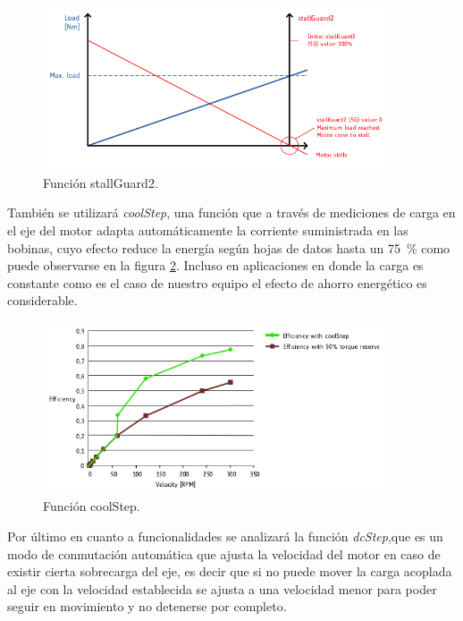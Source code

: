 \begin{figure}[ht]
\centering 
\includegraphics[width=0.9\textwidth]{./Figures/tmc5130_stallguard2.png}
\caption{Función stallGuard2.}
\label{fig:tmc5130_stallGuard2}
\end{figure}

También se utilizará \textit{coolStep}, una función que a través de mediciones de carga en el eje del motor adapta automáticamente la corriente suministrada en las bobinas, cuyo efecto reduce la energía según hojas de datos hasta un \SI{75}{\percent} como puede observarse en la figura \ref{fig:tmc5130_coolStep}. Incluso en aplicaciones en donde la carga es constante como es el caso de nuestro equipo el efecto de ahorro energético es considerable.

\begin{figure}[ht]
\centering 
\includegraphics[width=0.9\textwidth]{./Figures/tmc5130_coolstep.png}
\caption{Función coolStep.}
\label{fig:tmc5130_coolStep}
\end{figure}

Por último en cuanto a funcionalidades se analizará la función \textit{dcStep},que es un modo de conmutación automática que ajusta la velocidad del motor en caso de existir cierta sobrecarga del eje, es decir que si no puede mover la carga acoplada al eje con la velocidad establecida se ajusta a una velocidad menor para poder seguir en movimiento y no detenerse por completo. 


